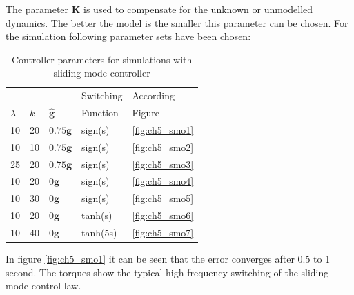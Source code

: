 The parameter $\mathbf{K}$ is used to compensate for the unknown or unmodelled dynamics. The better the model is the smaller this parameter can be chosen.
For the simulation following parameter sets have been chosen: 
\begin{table}[h]
	\begin{center}
		\label{tab:smo}
		\begin{tabular}{lllll}
			&     &							 &Switching& According          \\
			$\lambda$ & $k$ &$\hat{\mathbf{g}}$&Function& Figure             \\
			\midrule
			10    & 20 &$0.75\mathbf{g}  $& sign(s)& \ref{fig:ch5_smo1} \\
			10    & 10 &$0.75\mathbf{g}  $& sign(s)& \ref{fig:ch5_smo2} \\
			25    & 20 &$0.75\mathbf{g}  $& sign(s)& \ref{fig:ch5_smo3} \\
			10    & 20 &$0\mathbf{g}  $& sign(s)& \ref{fig:ch5_smo4} \\
			10    & 30 &$0\mathbf{g}  $& sign(s)& \ref{fig:ch5_smo5} \\
			10    & 20 &$0\mathbf{g}  $& tanh(s)& \ref{fig:ch5_smo6} \\
			10    & 40 &$0\mathbf{g}  $& tanh(5s)& \ref{fig:ch5_smo7} \\
			\bottomrule
		\end{tabular}
		\caption{Controller parameters for simulations with sliding mode controller}
	\end{center}
\end{table}

In figure \ref{fig:ch5_smo1} it can be seen that the error converges after 0.5 to 1 second. The torques show the typical high frequency switching of the sliding mode control law.

